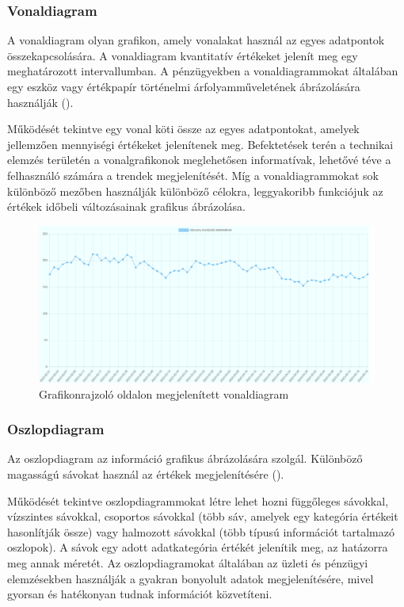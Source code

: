 
\subsubsection{Vonaldiagram}

A vonaldiagram olyan grafikon, amely vonalakat használ az egyes adatpontok összekapcsolására. A vonaldiagram kvantitatív értékeket jelenít meg egy meghatározott intervallumban. A pénzügyekben a vonaldiagrammokat általában egy eszköz vagy értékpapír történelmi árfolyamműveletének ábrázolására használják ().

	Működését tekintve egy vonal köti össze az egyes adatpontokat, amelyek jellemzően mennyiségi értékeket jelenítenek meg. Befektetések terén a technikai elemzés területén a vonalgrafikonok meglehetősen informatívak, lehetővé téve a felhasználó számára a trendek megjelenítését. Míg a vonaldiagrammokat sok különböző mezőben használják különböző célokra, leggyakoribb funkciójuk az értékek időbeli változásainak grafikus ábrázolása.

\begin{figure}[h]
\centering
\includegraphics[scale=0.3]{images/lineChartExample}
\caption{Grafikonrajzoló oldalon megjelenített vonaldiagram}
\label{fig:lineChartExample}
\end{figure}

\subsubsection{Oszlopdiagram}

Az oszlopdiagram az információ grafikus ábrázolására szolgál. Különböző magasságú sávokat használ az értékek megjelenítésére ().

	Működését tekintve oszlopdiagrammokat létre lehet hozni függőleges sávokkal, vízszintes sávokkal, csoportos sávokkal (több sáv, amelyek egy kategória értékeit hasonlítják össze) vagy halmozott sávokkal (több típusú információt tartalmazó oszlopok). A sávok egy adott adatkategória értékét jelenítik meg, az hatázorra meg annak méretét. Az oszlopdiagramokat általában az üzleti és pénzügyi elemzésekben használják a gyakran bonyolult adatok megjelenítésére, mivel gyorsan és hatékonyan tudnak információt közvetíteni.

